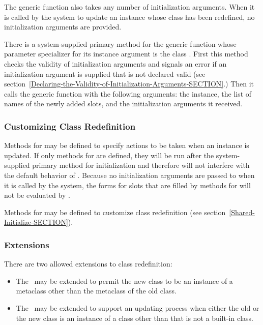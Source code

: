 The generic function  also
takes any number of initialization arguments.  When it is called by
the system to update an instance whose class has been redefined, no
initialization arguments are provided.

There is a system-supplied primary method for the generic function
 whose parameter specializer for
its instance argument is the class .  First this
method checks the validity of initialization arguments and signals an
error if an initialization argument is supplied that is not declared
valid (see
section~\ref{Declaring-the-Validity-of-Initialization-Arguments-SECTION}.)
Then it calls the generic function
 with the following arguments: the instance,
the list of names of the newly added slots, and the initialization
arguments it received.

\subsubsection{Customizing Class Redefinition}

Methods for  may be defined
to specify actions to be taken when an instance is updated.  If only
 methods for  are
defined, they will be run after the system-supplied primary method for
initialization and therefore will not interfere with the default
behavior of .  Because no
initialization arguments are passed to 
 when it is called by the system,
the  forms for slots that are filled by 
methods for  will not be
evaluated by .

Methods for  may be defined to customize class
redefinition (see section~\ref{Shared-Initialize-SECTION}).

\subsubsection{Extensions}

There are two allowed extensions to class redefinition: 

\begin{itemize}

\item  The \OS\ may be extended to permit the new class
to be an instance of a metaclass other than the metaclass of the
old class.

\item  The \OS\ may be extended to support an updating process
when either the old or the new class is an instance of a
class other than  that is not a built-in class.
\end{itemize}

